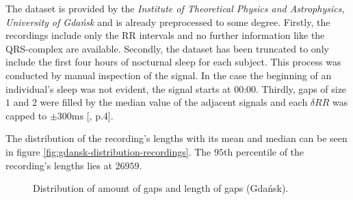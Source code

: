 \documentclass[11pt]{scrartcl}
\begin{document}
The dataset is provided by the \textit{Institute of Theoretical Physics and Astrophysics, University of Gdańsk} and is already preprocessed to some degree. Firstly, the recordings include only the RR intervals and no further information like the QRS-complex are available. Secondly, the dataset has been truncated to only include the first four hours of nocturnal sleep for each subject. This process was conducted by manual inspection of the signal. In the case the beginning of an individual's sleep was not evident, the signal starts at 00:00. Thirdly, gaps of size $1$ and $2$ were filled by the median value of the adjacent signals and each $\delta RR$ was capped to $\pm 300\text{ms}$ [\cite{patternshrd}, p.4].

The distribution of the recording's lengths with its mean and median can be seen in figure \ref{fig:gdansk-distribution-recordings}. The $95$th percentile of the recording's lengths lies at $26959$.

\begin{figure}[hbt]
	\caption{Distribution of amount of gaps and length of gaps (Gdańsk).}
\end{figure}
\end{document}
